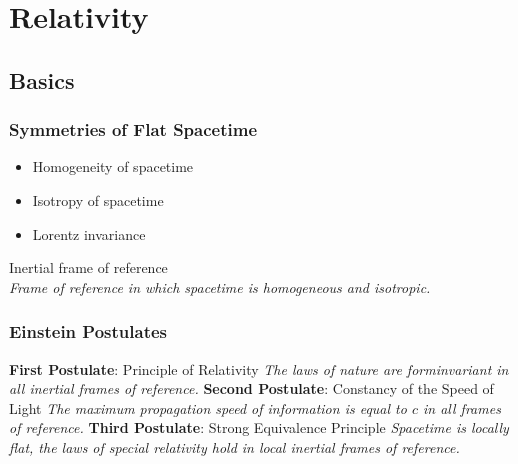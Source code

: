 \section{Relativity}
	\subsection{Basics}
		\subsubsection{Symmetries of Flat Spacetime}
			\begin{itemize}
				\item Homogeneity of spacetime
				\item Isotropy of spacetime
				\item Lorentz invariance
			\end{itemize}

			\noindent
			Inertial frame of reference \\
				\indent \textit{Frame of reference in which spacetime is homogeneous and isotropic.}

		\subsubsection{Einstein Postulates}
			\textbf{First Postulate}: Principle of Relativity \newline
				\indent \textit{The laws of nature are forminvariant in all inertial frames of reference.}  \nl
			\textbf{Second Postulate}: Constancy of the Speed of Light \newline
				\indent \textit{The maximum propagation speed of information is equal to $c$ in all frames of reference.}
				\label{post:c}\nl
			\textbf{Third Postulate}: Strong Equivalence Principle \newline
				\indent \textit{Spacetime is locally flat, \ie the laws of special relativity hold in local inertial frames of reference.}  \vsp


